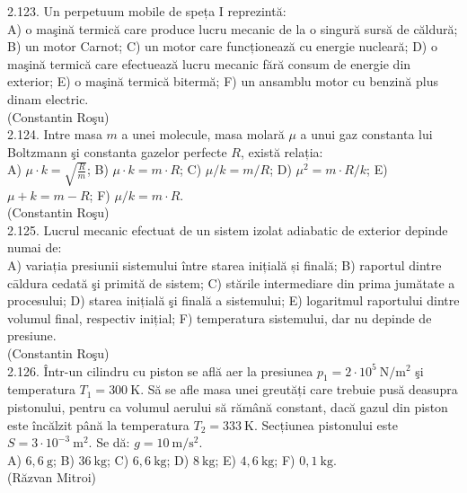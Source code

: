 2.123. Un perpetuum mobile de speța I reprezintă:\\ A) o maşină termică care produce lucru mecanic de la o singură sursă de căldură; B) un motor Carnot; C) un motor care funcționează cu energie nucleară; D) o maşină termică care efectuează lucru mecanic fără consum de energie din exterior; E) o maşină termică bitermă; F) un ansamblu motor cu benzină plus dinam electric.\\ (Constantin Roşu)\\

2.124. Intre masa $m$ a unei molecule, masa molară $\mu$ a unui gaz constanta lui Boltzmann şi constanta gazelor perfecte $R$, există relația:\\ A) $\mu \cdot k=\sqrt{\frac{R}{m}}$; B) $\mu \cdot k=m \cdot R$; C) $\mu / k=m / R$; D) $\mu^{2}=m \cdot R / k$; E) $\mu+k=m-R$; F) $\mu / k=m \cdot R$.\\ (Constantin Roşu)\\

2.125. Lucrul mecanic efectuat de un sistem izolat adiabatic de exterior depinde numai de:\\ A) variația presiunii sistemului între starea inițială și finală; B) raportul dintre cāldura cedată şi primită de sistem; C) stările intermediare din prima jumătate a procesului; D) starea inițială şi finală a sistemului; E) logaritmul raportului dintre volumul final, respectiv inițial; F) temperatura sistemului, dar nu depinde de presiune.\\ (Constantin Roşu)\\

2.126. Într-un cilindru cu piston se află aer la presiunea $p_{1}=2 \cdot 10^{5} \mathrm{~N} / \mathrm{m}^{2}$ şi temperatura $T_{1}=300 \mathrm{~K}$. Să se afle masa unei greutăți care trebuie pusă deasupra pistonului, pentru ca volumul aerului să rămână constant, dacă gazul din piston este încălzit până la temperatura $T_{2}=333 \mathrm{~K}$. Secțiunea pistonului este $S=3 \cdot 10^{-3} \mathrm{~m}^{2}$. Se dă: $g=10 \mathrm{~m} / \mathrm{s}^{2}$.\\ A) $6,6 \mathrm{~g}$; B) $36 \mathrm{~kg}$; C) $6,6 \mathrm{~kg}$; D) $8 \mathrm{~kg}$; E) $4,6 \mathrm{~kg}$; F) $0,1 \mathrm{~kg}$.\\ (Răzvan Mitroi)\\

